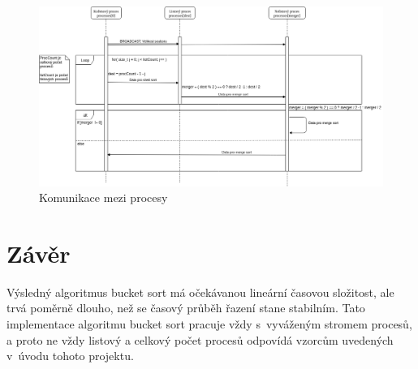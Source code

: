 \documentclass[11pt,a4paper,titlepage]{article}
\begin{document}
        \begin{figure}[H]
            \includegraphics[width=1\linewidth]{sequenceDiagram.png}
            \caption{Komunikace mezi procesy}
        \end{figure}

	\section{Závěr}
        Výsledný algoritmus bucket sort má očekávanou lineární časovou složitost, ale trvá poměrně dlouho, než se časový průběh řazení stane stabilním. Tato
        implementace algoritmu bucket sort pracuje vždy s~vyváženým stromem procesů, a proto ne vždy listový a celkový počet procesů odpovídá vzorcům
        uvedených v~úvodu tohoto projektu.
\end{document}
